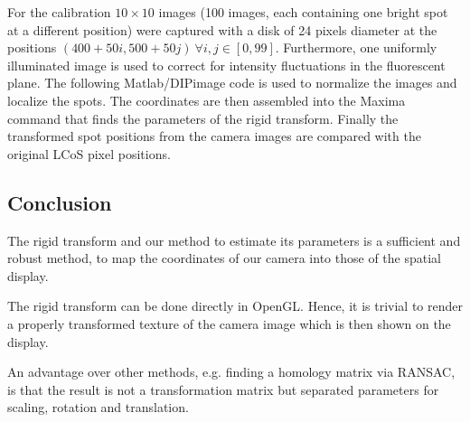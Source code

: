 For the calibration $10\times10$ images (100 images, each containing
one bright spot at a different position) were captured with a disk of
24 pixels diameter at the positions $(400+50i,500+50j)\ \forall i,j\in
[0,99]$. Furthermore, one uniformly illuminated image is used to
correct for intensity fluctuations in the fluorescent plane.  The
following Matlab/DIPimage code is used to normalize the images and
localize the spots. The coordinates are then assembled into the Maxima
command that finds the parameters of the rigid transform. Finally the
transformed spot positions from the camera images are compared with
the original LCoS pixel positions.


\subsection{Conclusion}
The rigid transform and our method to estimate its parameters is a
sufficient and robust method, to map the coordinates of our camera
into those of the spatial display.



The rigid transform can be done directly in OpenGL. Hence, it is
trivial to render a properly transformed texture of the camera
image which is then shown on the display.

An advantage over other methods, e.g. finding a homology matrix via
RANSAC, is that the result is not a transformation matrix but
separated parameters for scaling, rotation and translation. 




